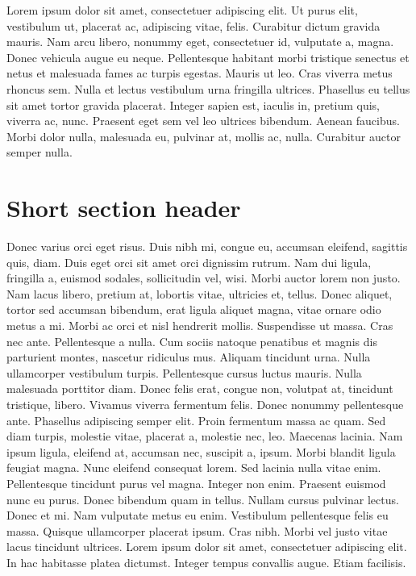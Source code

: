 \documentclass[draft,12pt,twoside,a4paper]{book}
\begin{document}
Lorem ipsum dolor sit amet, consectetuer adipiscing elit.
Ut purus elit, vestibulum ut, placerat ac, adipiscing vitae, felis.
Curabitur dictum gravida mauris.
Nam arcu libero, nonummy eget, consectetuer id, vulputate a, magna.
Donec vehicula augue eu neque.
Pellentesque habitant morbi tristique senectus et netus et malesuada
 fames ac turpis egestas.
Mauris ut leo.
Cras viverra metus rhoncus sem.
Nulla et lectus vestibulum urna fringilla ultrices.
Phasellus eu tellus sit amet tortor gravida placerat.
Integer sapien est, iaculis in, pretium quis, viverra ac, nunc.
Praesent eget sem vel leo ultrices bibendum.
Aenean faucibus.
Morbi dolor nulla, malesuada eu, pulvinar at, mollis ac, nulla.
Curabitur auctor semper nulla.

\section{Short section header}
Donec varius orci eget risus.
Duis nibh mi, congue eu, accumsan eleifend, sagittis quis, diam.
Duis eget orci sit amet orci dignissim rutrum.
Nam dui ligula, fringilla a, euismod sodales, sollicitudin vel, wisi.
Morbi auctor lorem non justo.
Nam lacus libero, pretium at, lobortis vitae, ultricies et, tellus.
Donec aliquet, tortor sed accumsan bibendum, erat ligula aliquet magna,
 vitae ornare odio metus a mi.
Morbi ac orci et nisl hendrerit mollis.
Suspendisse ut massa.
Cras nec ante.
Pellentesque a nulla.
Cum sociis natoque penatibus et magnis dis parturient montes,
 nascetur ridiculus mus.
Aliquam tincidunt urna.
Nulla ullamcorper vestibulum turpis.
Pellentesque cursus luctus mauris.
Nulla malesuada porttitor diam.
Donec felis erat, congue non, volutpat at, tincidunt tristique, libero.
Vivamus viverra fermentum felis.
Donec nonummy pellentesque ante.
Phasellus adipiscing semper elit.
Proin fermentum massa ac quam.
Sed diam turpis, molestie vitae, placerat a, molestie nec, leo.
Maecenas lacinia.
Nam ipsum ligula, eleifend at, accumsan nec, suscipit a, ipsum.
Morbi blandit ligula feugiat magna.
Nunc eleifend consequat lorem.
Sed lacinia nulla vitae enim.
Pellentesque tincidunt purus vel magna.
Integer non enim.
Praesent euismod nunc eu purus.
Donec bibendum quam in tellus.
Nullam cursus pulvinar lectus.
Donec et mi.
Nam vulputate metus eu enim.
Vestibulum pellentesque felis eu massa.
Quisque ullamcorper placerat ipsum.
Cras nibh.
Morbi vel justo vitae lacus tincidunt ultrices.
Lorem ipsum dolor sit amet, consectetuer adipiscing elit.
In hac habitasse platea dictumst.
Integer tempus convallis augue.
Etiam facilisis.
\end{document}
